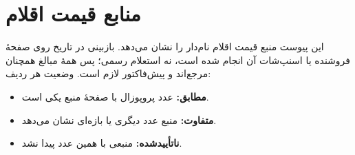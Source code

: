 \section{منابع قیمت اقلام}
\label{app:prices}
این پیوست منبع قیمت اقلام نام‌دار را نشان می‌دهد. بازبینی در تاریخ  روی صفحهٔ فروشنده یا اسنپ‌شات آن انجام شده است، نه استعلام رسمی؛ پس همهٔ مبالغ همچنان مرجع‌اند و پیش‌فاکتور لازم است. وضعیت هر ردیف:
\begin{itemize}[leftmargin=*,itemsep=2pt]
\item \textbf{مطابق:} عدد پروپوزال با صفحهٔ منبع یکی است.
\item \textbf{متفاوت:} منبع عدد دیگری یا بازه‌ای نشان می‌دهد.
\item \textbf{ناتأییدشده:} منبعی با همین عدد پیدا نشد.
\end{itemize}

